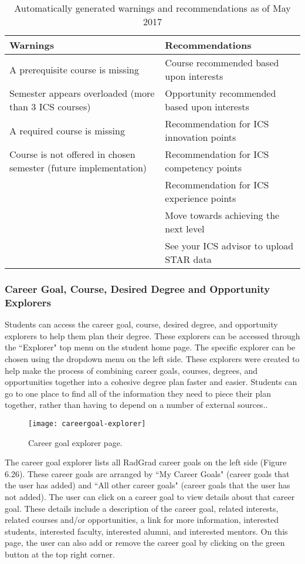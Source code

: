 \begin{table}[htbp!]
\centering
\begin{tabular}{  |p{8cm}|p{8cm}| } 
  \hline
 \textbf{Warnings} & \textbf{Recommendations} \\ 
  \hline
A prerequisite course is missing & Course recommended based upon interests\\
\hline
Semester appears overloaded (more than 3 ICS courses) & Opportunity recommended based upon interests\\
\hline
A required course is missing & Recommendation for ICS innovation points \\
\hline
Course is not offered in chosen semester (future implementation) & Recommendation for ICS competency points \\
\hline
& Recommendation for ICS experience points\\
\hline
& Move towards achieving the next level \\
\hline
& See your ICS advisor to upload STAR data\\
 \hline
\end{tabular}
\caption{Automatically generated warnings and recommendations as of May 2017}
\label{table:4}
\end{table}

\subsubsection{Career Goal, Course, Desired Degree and Opportunity Explorers}
Students can access the career goal, course, desired degree, and opportunity explorers to help them plan their degree.  These explorers can be accessed through the ``Explorer" top menu on the student home page. The specific explorer can be chosen using the dropdown menu on the left side. These explorers were created to help make the process of combining career goals, courses, degrees, and opportunities together into a cohesive degree plan faster and easier. Students can go to one place to find all of the information they need to piece their plan together, rather than having to depend on a number of external sources..

\begin{figure}[htbp!]
\centering
\texttt{[image: careergoal-explorer]}
\caption{Career goal explorer page.}
\end{figure}

The career goal explorer lists all RadGrad career goals on the left side (Figure 6.26). These career goals are arranged by ``My Career Goals" (career goals that the user has added) and ``All other career goals" (career goals that the user has not added). The user can click on a career goal to view details about that career goal. These details include a description of the career goal, related interests, related courses and/or opportunities, a link for more information, interested students, interested faculty, interested alumni, and interested mentors. On this page, the user can also add or remove the career goal by clicking on the green button at the top right corner.  

